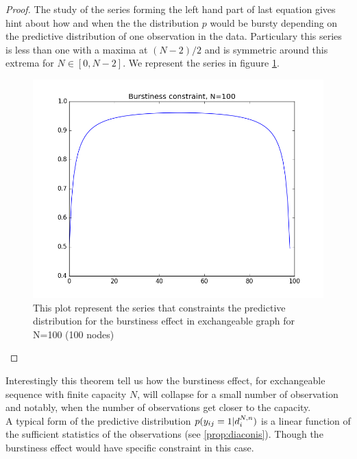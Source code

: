 \begin{proof}
	The study of the series forming the left hand part of last equation gives hint about how and when the the distribution $p$ would be bursty depending on the predictive distribution of one observation in the data. Particulary this series is less than one with a maxima at $(N-2)/2$ and is symmetric around this extrema for $N \in [0, N-2]$. We represent the series in figuure \ref{fig:bp}.
	
	
	\begin{figure}[h]
		\centering
		\includegraphics[scale=0.4]{img/bp}
		\caption{This plot represent the series that constraints the predictive distribution for the burstiness effect in exchangeable graph for N=100 (100 nodes)}
		\label{fig:bp}
	\end{figure}

\label{b-theorem}
\end{proof}

Interestingly this theorem tell us how the burstiness effect, for exchangeable sequence with finite capacity $N$, will collapse for a small number of observation and notably, when the number of observations get closer to the capacity.\\

A typical form of the predictive distribution $p(y_{ij}=1 | d_i^{N,n})$ is a linear function of the sufficient statistics of the observations (see \ref{prop:diaconis}). Though the burstiness effect would have specific constraint in this case.





